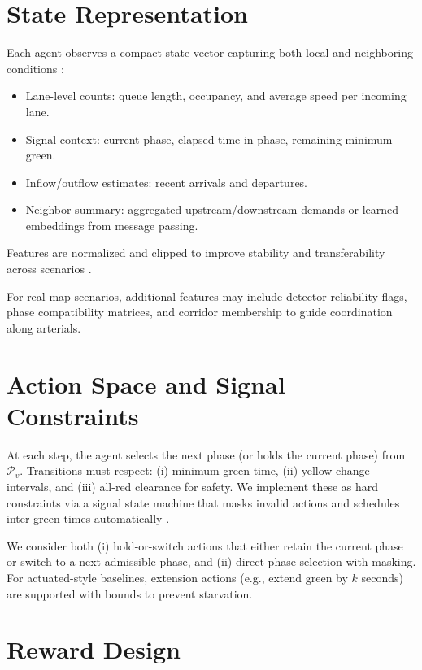 \documentclass[12pt]{report} %
\begin{document}
\section{State Representation}

Each agent observes a compact state vector capturing both local and neighboring conditions \cite{GNN_Traffic2022,GraphLight2023,AttentionMARL2024}:
\begin{itemize}
  \item Lane-level counts: queue length, occupancy, and average speed per incoming lane.
  \item Signal context: current phase, elapsed time in phase, remaining minimum green.
  \item Inflow/outflow estimates: recent arrivals and departures.
  \item Neighbor summary: aggregated upstream/downstream demands or learned embeddings from message passing.
\end{itemize}
Features are normalized and clipped to improve stability and transferability across scenarios \cite{ITS_ML2022,TransferableMARL_2024}.

For real-map scenarios, additional features may include detector reliability flags, phase compatibility matrices, and corridor membership to guide coordination along arterials.

\section{Action Space and Signal Constraints}

At each step, the agent selects the next phase (or holds the current phase) from $\mathcal{P}_v$. Transitions must respect: (i) minimum green time, (ii) yellow change intervals, and (iii) all-red clearance for safety. We implement these as hard constraints via a signal state machine that masks invalid actions and schedules inter-green times automatically \cite{Du_2023,SCATS2021}.

We consider both (i) hold-or-switch actions that either retain the current phase or switch to a next admissible phase, and (ii) direct phase selection with masking. For actuated-style baselines, extension actions (e.g., extend green by $k$ seconds) are supported with bounds to prevent starvation.

\section{Reward Design}
\end{document}
